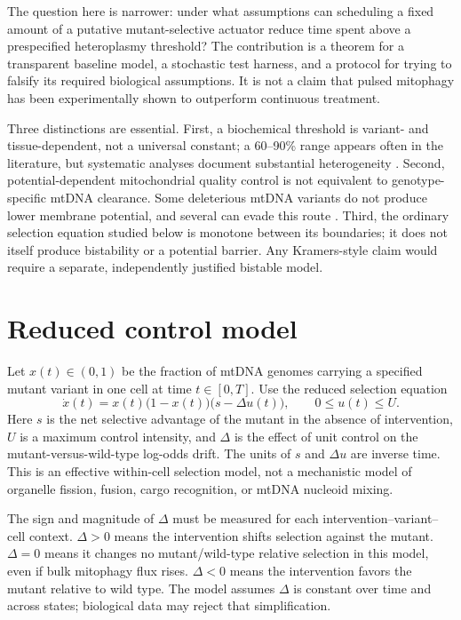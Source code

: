 \documentclass[11pt]{article}
\begin{document}
The question here is narrower: under what assumptions can scheduling a fixed amount of a putative mutant-selective actuator reduce time spent above a prespecified heteroplasmy threshold? The contribution is a theorem for a transparent baseline model, a stochastic test harness, and a protocol for trying to falsify its required biological assumptions. It is not a claim that pulsed mitophagy has been experimentally shown to outperform continuous treatment.

Three distinctions are essential. First, a biochemical threshold is variant- and tissue-dependent, not a universal constant; a 60--90\% range appears often in the literature, but systematic analyses document substantial heterogeneity \cite{Smith2024}. Second, potential-dependent mitochondrial quality control is not equivalent to genotype-specific mtDNA clearance. Some deleterious mtDNA variants do not produce lower membrane potential, and several can evade this route \cite{Suen2008,Seabright2020,Ryall2026}. Third, the ordinary selection equation studied below is monotone between its boundaries; it does not itself produce bistability or a potential barrier. Any Kramers-style claim would require a separate, independently justified bistable model.

\section{Reduced control model}
Let $x(t)\in(0,1)$ be the fraction of mtDNA genomes carrying a specified mutant variant in one cell at time $t\in[0,T]$. Use the reduced selection equation
\begin{equation}
\dot{x}(t)=x(t)\bigl(1-x(t)\bigr)\bigl(s-\Delta u(t)\bigr),\qquad 0\leq u(t)\leq U. \label{eq:base}
\end{equation}
Here $s$ is the net selective advantage of the mutant in the absence of intervention, $U$ is a maximum control intensity, and $\Delta$ is the effect of unit control on the mutant-versus-wild-type log-odds drift. The units of $s$ and $\Delta u$ are inverse time. This is an effective within-cell selection model, not a mechanistic model of organelle fission, fusion, cargo recognition, or mtDNA nucleoid mixing.

The sign and magnitude of $\Delta$ must be measured for each intervention--variant--cell context. $\Delta>0$ means the intervention shifts selection against the mutant. $\Delta=0$ means it changes no mutant/wild-type relative selection in this model, even if bulk mitophagy flux rises. $\Delta<0$ means the intervention favors the mutant relative to wild type. The model assumes $\Delta$ is constant over time and across states; biological data may reject that simplification.
\end{document}
